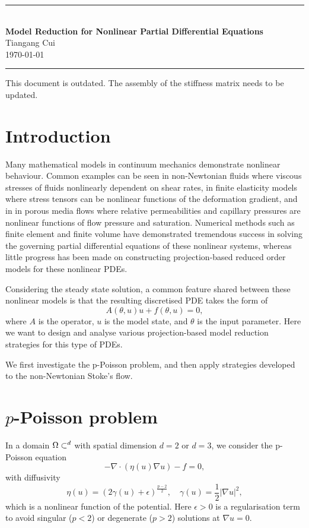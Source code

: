 \documentclass[a4paper,11pt]{scrartcl}
\newcommand{\eq}[1]{\begin{equation} #1 \end{equation}}
\begin{document}
\begin{center}
{\Large
{\rule{\linewidth}{2pt}}\\[0.5cm]
{\bf Model Reduction for Nonlinear Partial Differential Equations}\\
\normalsize Tiangang Cui \\ \today\\[0.25cm]
{\rule{\linewidth}{2pt}}
}
\end{center}

This document is outdated. The assembly of the stiffness matrix needs to be updated. 


\section{Introduction}


Many mathematical models in continuum mechanics demonstrate nonlinear behaviour. Common examples can be seen in non-Newtonian fluids where viscous stresses of fluids nonlinearly dependent on shear rates, in finite elasticity models where stress tensors can be nonlinear functions of the deformation gradient, and in in porous media flows where relative permeabilities and capillary pressures are nonlinear functions of flow pressure and saturation.
%
Numerical methods such as finite element and finite volume have demonstrated tremendous success in solving the governing partial differential equations of these nonlinear systems, whereas little progress has been made on constructing projection-based reduced order models for these nonlinear PDEs.

Considering the steady state solution, a common feature shared between these nonlinear models is that the resulting discretised PDE takes the form of
\begin{equation}
A(\theta, u) u + f(\theta, u) = 0,
\end{equation}
where $A$ is the operator, $u$ is the model state, and $\theta$ is the input parameter.
%
Here we want to design and analyse various projection-based model reduction strategies for this type of PDEs.

We first investigate the p-Poisson problem, and then apply strategies developed to the non-Newtonian Stoke's flow.

\section{$p$-Poisson problem}

In a domain $\Omega \subset \real^d$ with spatial dimension $d = 2$ or $d = 3$, we consider the p-Poisson equation
\eq{ - \nabla \cdot \left( \eta\left(u\right) \nabla u \right) - f = 0 ,}
with diffusivity
\eq{ \eta(u) = ( 2 \gamma(u) + \epsilon )^{\frac{p-2}{2}} ,\quad \gamma(u) = \frac12 |\nabla u|^2, }
which is a nonlinear function of the potential.
%
Here $\epsilon > 0$ is a regularisation term to avoid singular ($p < 2$) or degenerate ($p > 2$) solutions at $\nabla u = 0$.
\end{document}
